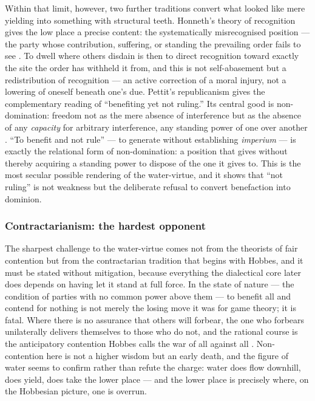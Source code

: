 Within that limit, however, two further traditions convert what looked like mere yielding into something with structural teeth. Honneth's theory of recognition gives the low place a precise content: the systematically misrecognised position --- the party whose contribution, suffering, or standing the prevailing order fails to see \parencite{honneth1995}. To dwell where others disdain is then to direct recognition toward exactly the site the order has withheld it from, and this is not self-abasement but a redistribution of recognition --- an active correction of a moral injury, not a lowering of oneself beneath one's due. Pettit's republicanism gives the complementary reading of ``benefiting yet not ruling.'' Its central good is non-domination: freedom not as the mere absence of interference but as the absence of any \emph{capacity} for arbitrary interference, any standing power of one over another \parencite{pettit1997}. ``To benefit and not rule'' --- to generate without establishing \emph{imperium} --- is exactly the relational form of non-domination: a position that gives without thereby acquiring a standing power to dispose of the one it gives to. This is the most secular possible rendering of the water-virtue, and it shows that ``not ruling'' is not weakness but the deliberate refusal to convert benefaction into dominion.

\subsubsection{Contractarianism: the hardest opponent}
\label{p20:ssub:review-hobbes}

The sharpest challenge to the water-virtue comes not from the theorists of fair contention but from the contractarian tradition that begins with Hobbes, and it must be stated without mitigation, because everything the dialectical core later does depends on having let it stand at full force. In the state of nature --- the condition of parties with no common power above them --- to benefit all and contend for nothing is not merely the losing move it was for game theory; it is fatal. Where there is no assurance that others will forbear, the one who forbears unilaterally delivers themselves to those who do not, and the rational course is the anticipatory contention Hobbes calls the war of all against all \parencite{hobbes1651}. Non-contention here is not a higher wisdom but an early death, and the figure of water seems to confirm rather than refute the charge: water does flow downhill, does yield, does take the lower place --- and the lower place is precisely where, on the Hobbesian picture, one is overrun.

